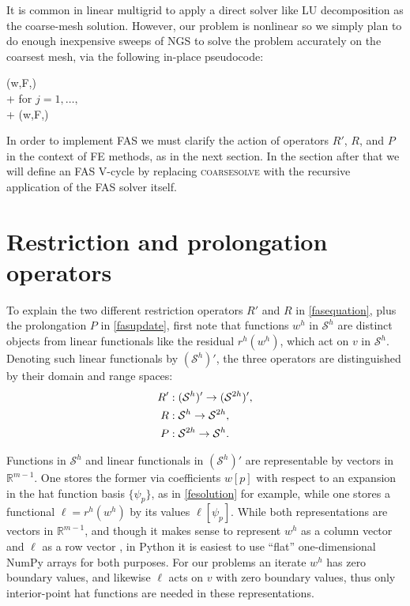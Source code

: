 \documentclass[letterpaper,final,12pt,reqno]{amsart}
\newcommand{\RR}{\mathbb{R}}
\begin{document}
It is common in linear multigrid \cite{Briggsetal2000,Bueler2021,Trottenbergetal2001} to apply a direct solver like LU decomposition as the coarse-mesh solution.  However, our problem is nonlinear so we simply plan to do enough inexpensive sweeps of NGS to solve the problem accurately on the coarsest mesh, via the following in-place pseudocode:

\begin{pseudo*}
(w,F,\ell)\text{:} \\+
    for $j=1,\dots,$ \\+
        (w,F,\ell)
\end{pseudo*}

In order to implement FAS we must clarify the action of operators $R'$, $R$, and $P$ in the context of FE methods, as in the next section.  In the section after that we will define an FAS V-cycle by replacing \textsc{coarsesolve} with the recursive application of the FAS solver itself.


\section{Restriction and prolongation operators}

To explain the two different restriction operators $R'$ and $R$ in \eqref{fasequation}, plus the prolongation $P$ in \eqref{fasupdate}, first note that functions $w^h$ in $\mathcal{S}^h$ are distinct objects from linear functionals like the residual $r^h(w^h)$, which act on $v$ in $\mathcal{S}^h$.  Denoting such linear functionals by $(\mathcal{S}^h)'$, the three operators are distinguished by their domain and range spaces:
\begin{align}
  R' &: (\mathcal{S}^h)' \to (\mathcal{S}^{2h})', \label{rpoperators} \\
  R  &: \mathcal{S}^h \to \mathcal{S}^{2h}, \notag \\
  P  &: \mathcal{S}^{2h} \to \mathcal{S}^h. \notag
\end{align}

Functions in $\mathcal{S}^h$ and linear functionals in $(\mathcal{S}^h)'$ are representable by vectors in $\RR^{m-1}$.  One stores the former via coefficients $w[p]$ with respect to an expansion in the hat function basis $\{\psi_p\}$, as in \eqref{fesolution} for example, while one stores a functional $\ell=r^h(w^h)$ by its values $\ell[\psi_p]$.  While both representations are vectors in $\RR^{m-1}$, and though it makes sense to represent $w^h$ as a column vector and $\ell$ as a row vector \cite{TrefethenBau1997}, in Python it is easiest to use ``flat'' one-dimensional NumPy arrays for both purposes.  For our problems an iterate $w^h$ has zero boundary values, and likewise $\ell$ acts on $v$ with zero boundary values, thus only interior-point hat functions are needed in these representations.
\end{document}
